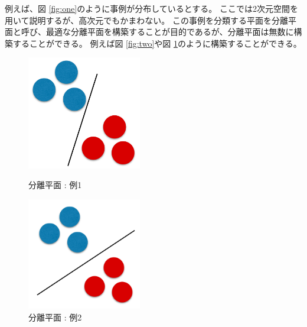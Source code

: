 \documentclass[titlepage,12pt]{jreport}
\begin{document}
例えば、図 \ref{fig:one}のように事例が分布しているとする。 ここでは2次元空間を用いて説明するが、高次元でもかまわない。 この事例を分類する平面を分離平面と呼び、最適な分離平面を構築することが目的であるが、分離平面は無数に構築することができる。 例えば図 \ref{fig:two}や図 \ref{fig:three}のように構築することができる。
\begin{figure}[htbp]
	\begin{minipage}{0.50\hsize}
		\begin{center}
			\includegraphics[width = 50mm,bb = 0 0 357 354]{img/svm2.png}
		\end{center}
		\caption{分離平面 : 例1}
		\label{fig:two}
	\end{minipage}
	\begin{minipage}{0.50\hsize}
		\begin{center}
			\includegraphics[width = 50mm,bb = 0 0 255 250]{img/svm3.png}
		\end{center}
		\caption{分離平面 : 例2}
		\label{fig:three}
	\end{minipage}
\end{figure}
\end{document}
